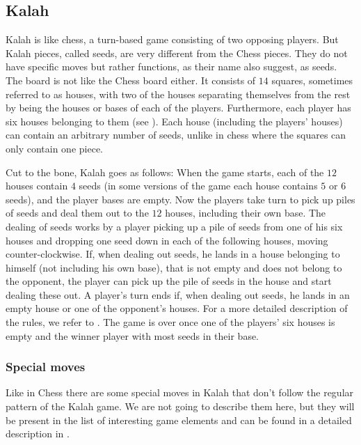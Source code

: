 \subsection{Kalah}

Kalah is like chess, a turn-based game consisting of two opposing
players. But Kalah pieces, called seeds, are very different from the
Chess pieces. They do not have specific moves but rather functions,
as their name also suggest, as seeds. The board is not like the Chess
board either. It consists of $14$ squares, sometimes referred to as 
houses\cite{kalahrules}, with two of the houses separating themselves from the
rest by being the houses or bases of each of the players. Furthermore,
each player has six houses belonging to them (see ).
Each house (including the players' houses) can contain an arbitrary
number of seeds, unlike in chess where the squares can only contain one
piece.

Cut to the bone, Kalah goes as follows: When the game starts, each
of the $12$ houses contain $4$ seeds (in some versions of the game
each house contains $5$ or $6$ seeds), and the player bases are empty.
Now the players take turn to pick up piles of seeds and deal them out
to the $12$ houses, including their own base. The dealing of seeds
works by a player picking up a pile of seeds from one of his six houses
and dropping one seed down in each of the following houses, moving
counter-clockwise. If, when dealing out seeds, he lands in a house
belonging to himself (not including his own base), that is not empty
and does not belong to the opponent, the player can pick up the pile of
seeds in the house and start dealing these out. A player's turn ends
if, when dealing out seeds, he lands in an empty house or one of the
opponent's houses. For a more detailed description of the rules, we
refer to \cite{kalahrules}. The game is over once one of the players'
six houses is empty and the winner player with most seeds in their base.


\subsubsection{Special moves}
Like in Chess there are some special moves in Kalah that don't follow the
regular pattern of the Kalah game. We are not going to describe them here, but
they will be present in the list of interesting game elements and can be found
in a detailed description in \cite{kalahrules}.


